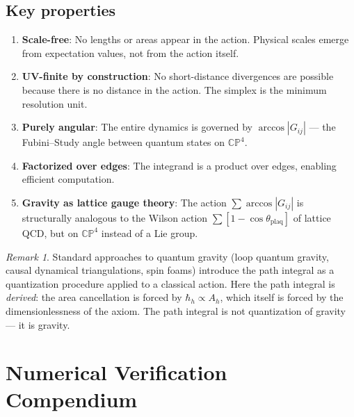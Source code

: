 \documentclass[12pt]{article}
\theoremstyle{remark}
\newtheorem{remark}[theorem]{Remark}
\theoremstyle{definition}
\begin{document}
\subsection{Key properties}

\begin{enumerate}
\item \textbf{Scale-free}: No lengths or areas appear in the action. Physical scales emerge from expectation values, not from the action itself.

\item \textbf{UV-finite by construction}: No short-distance divergences are possible because there is no distance in the action. The simplex is the minimum resolution unit.

\item \textbf{Purely angular}: The entire dynamics is governed by $\arccos|G_{ij}|$ --- the Fubini--Study angle between quantum states on $\mathbb{CP}^4$.

\item \textbf{Factorized over edges}: The integrand is a product over edges, enabling efficient computation.

\item \textbf{Gravity as lattice gauge theory}: The action $\sum\arccos|G_{ij}|$ is structurally analogous to the Wilson action $\sum[1 - \cos\theta_\text{plaq}]$ of lattice QCD, but on $\mathbb{CP}^4$ instead of a Lie group.
\end{enumerate}

\begin{remark}
Standard approaches to quantum gravity (loop quantum gravity, causal dynamical triangulations, spin foams) introduce the path integral as a quantization procedure applied to a classical action. Here the path integral is \emph{derived}: the area cancellation is forced by $\hbar_h \propto A_h$, which itself is forced by the dimensionlessness of the axiom. The path integral is not quantization of gravity --- it is gravity.
\end{remark}


\section{Numerical Verification Compendium}
\label{app:verification}
\end{document}
